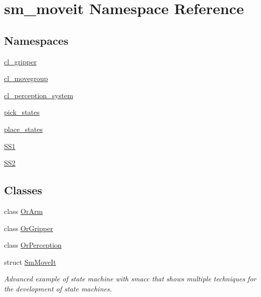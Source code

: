\hypertarget{namespacesm__moveit}{}\section{sm\+\_\+moveit Namespace Reference}
\label{namespacesm__moveit}
\subsection*{Namespaces}
\begin{DoxyCompactItemize}
\item 
 \hyperlink{namespacesm__moveit_1_1cl__gripper}{cl\+\_\+gripper}
\item 
 \hyperlink{namespacesm__moveit_1_1cl__movegroup}{cl\+\_\+movegroup}
\item 
 \hyperlink{namespacesm__moveit_1_1cl__perception__system}{cl\+\_\+perception\+\_\+system}
\item 
 \hyperlink{namespacesm__moveit_1_1pick__states}{pick\+\_\+states}
\item 
 \hyperlink{namespacesm__moveit_1_1place__states}{place\+\_\+states}
\item 
 \hyperlink{namespacesm__moveit_1_1SS1}{S\+S1}
\item 
 \hyperlink{namespacesm__moveit_1_1SS2}{S\+S2}
\end{DoxyCompactItemize}
\subsection*{Classes}
\begin{DoxyCompactItemize}
\item 
class \hyperlink{classsm__moveit_1_1OrArm}{Or\+Arm}
\item 
class \hyperlink{classsm__moveit_1_1OrGripper}{Or\+Gripper}
\item 
class \hyperlink{classsm__moveit_1_1OrPerception}{Or\+Perception}
\item 
struct \hyperlink{structsm__moveit_1_1SmMoveIt}{Sm\+Move\+It}
\begin{DoxyCompactList}\small\item\em Advanced example of state machine with smacc that shows multiple techniques for the development of state machines. \end{DoxyCompactList}\end{DoxyCompactItemize}
